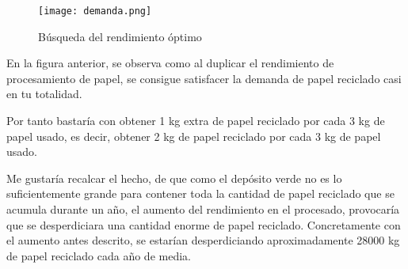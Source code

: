 \begin{figure}[H]
	\centering
	\texttt{[image: demanda.png]}
	\caption{Búsqueda del rendimiento óptimo}
\end{figure}

En la figura anterior, se observa como al duplicar el rendimiento de procesamiento de papel, se consigue satisfacer la demanda de papel reciclado casi en tu totalidad.

Por tanto bastaría con obtener 1 kg extra de papel reciclado por cada 3 kg de papel usado, es decir, obtener 2 kg de papel reciclado por cada 3 kg de papel usado.

Me gustaría recalcar el hecho, de que como el depósito verde no es lo suficientemente grande para contener toda la cantidad de papel reciclado que se acumula durante un año, el aumento del rendimiento en el procesado, provocaría que se desperdiciara una cantidad enorme de papel reciclado. Concretamente con el aumento antes descrito, se estarían desperdiciando aproximadamente 28000 kg de papel reciclado cada año de media.
